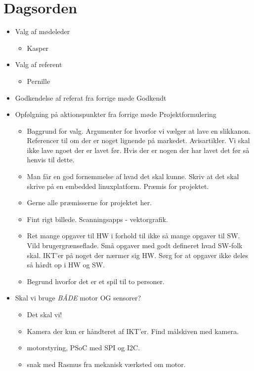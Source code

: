 \documentclass{article}
\begin{document}
	\section{Dagsorden}
	\begin{itemize}
	\item Valg af mødeleder
		\begin{itemize} 
			\item Kasper
		\end{itemize}
	\item Valg af referent
		\begin{itemize}
			\item Pernille 
		\end{itemize}
	\item Godkendelse af referat fra forrige møde 
		\subitem Godkendt 
	\item Opfølgning på aktionspunkter fra forrige møde
		\subitem Projektformulering
		\begin{itemize}
			\item Baggrund for valg. Argumenter for hvorfor vi vælger at lave en slikkanon. Referencer til om der er noget lignende på markedet. Avisartikler. Vi skal ikke lave ngoet der er lavet før. 
			\subitem Hvis der er nogen der har lavet det før så henvis til dette. 
			\item Man får en god fornemmelse af hvad det skal kunne. Skriv at det skal skrive på en embedded linuxplatform. Præmis for projektet. 
			\item Gerne alle præmisserne for projektet her. 
			\item Fint rigt billede. Scanningsapps - vektorgrafik. 
			\item Ret mange opgaver til HW i forhold til ikke så mange opgaver til SW. 
			\subitem Vild brugergrænseflade. 
			\subitem Små opgaver med godt defineret hvad SW-folk skal. 
			\subitem IKT'er på noget der nærmer sig HW. 
			\subitem Sørg for at opgaver ikke deles så hårdt op i HW og SW. 
			\item Begrund hvorfor det er et spil til to personer. 
		\end{itemize}
	\item Skal vi bruge \textit{BÅDE} motor OG sensorer?
		\begin{itemize}
			\item Det skal vi! 
			\item Kamera der kun er håndteret af IKT'er. Find målskiven med kamera. 
			\item motorstyring, PSoC med SPI og I2C. 
			\item snak med Rasmus fra mekanisk værksted om motor. 

\end{itemize}
\end{itemize}
\end{document}
